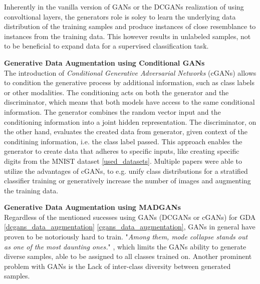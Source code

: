 Inherently in the vanilla version of GANs or the DCGANs realization of using convoltional layers, the generators role is soley to learn the underlying data distribution of the training samples and produce instances of close resemblance to instances from the training data. This however results in unlabeled samples, not to be beneficial to expand data for a supervised classification task.

\noindent\textbf{Generative Data Augmentation using Conditional GANs}\label{cgans_data_augmentation} \\
The introduction of \textit{Conditional Generative Adversarial Networks} (cGANs) \cite{mirza2014conditionalgenerativeadversarialnets} allows to condition the generative process by additional information, such as class labels or other modalities. The conditioning acts on both the generator and the discriminator, which means that both models have access to the same conditional information. The generator combines the random vector input and the conditioning information into a joint hidden representation. The discriminator, on the other hand, evaluates the created data from generator, given context of the conditining information, i.e. the class label passed. This approach enables the generator to create data that adheres to specific inputs, like creating specific digits from the MNIST dataset \ref{used_datasets}. Multiple papers were able to utilize the advantages of cGANs, to e.g. unify class distributions for a stratified classifier training or generatively increase the number of images and augmenting the training data\cite{jeong2022gan}\cite{zhao2023gan}\cite{cGANGDA2025asurveyreview}\cite{wickramaratne2021conditional}.

\noindent\textbf{Generative Data Augmentation using MADGANs}\label{madgans_data_augmentation} \\
Regardless of the mentioned sucesses using GANs (DCGANs or cGANs) for GDA \ref{dcgans_data_augmentation} \ref{cgans_data_augmentation}, GANs in general have proven to be notoriously hard to train. "\textit{Among them, mode collapse stands out as one of the most daunting ones.}" \cite{durall2020combatingmodecollapsegan}, which limits the GANs ability to generate diverse samples, able to be assigned to all classes trained on. Another prominent problem with GANs is the Lack of inter-class diversity between generated samples.

